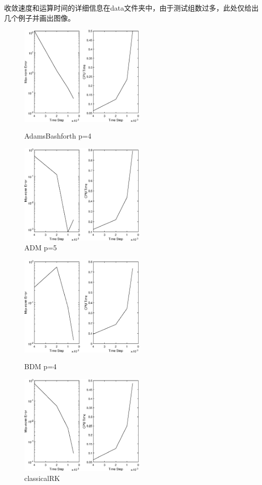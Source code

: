\documentclass[12]{article}%
\begin{document}
收敛速度和运算时间的详细信息在data文件夹中，由于测试组数过多，此处仅给出几个例子并画出图像。

\begin{figure}[H]
    \centering
    \begin{minipage}[t]{0.48\textwidth}
    \centering
    \includegraphics[width=6cm]{../pic/AdamsBashforth4test1.eps}
    \caption{AdamsBashforth p=4}
    \end{minipage}
    \begin{minipage}[t]{0.48\textwidth}
    \centering
    \includegraphics[width=6cm]{../pic/AdamsMoulton5test1.eps}
    \caption{ADM p=5}
    \end{minipage}
\end{figure}
\begin{figure}[H]
    \centering
    \begin{minipage}[t]{0.48\textwidth}
    \centering
    \includegraphics[width=6cm]{../pic/BackDifferFormula4test1.eps}
    \caption{BDM p=4}
    \end{minipage}
    \begin{minipage}[t]{0.48\textwidth}
    \centering
    \includegraphics[width=6cm]{../pic/classicalRK4test1.eps}
    \caption{classicalRK}
    \end{minipage}
\end{figure}
\end{document}
